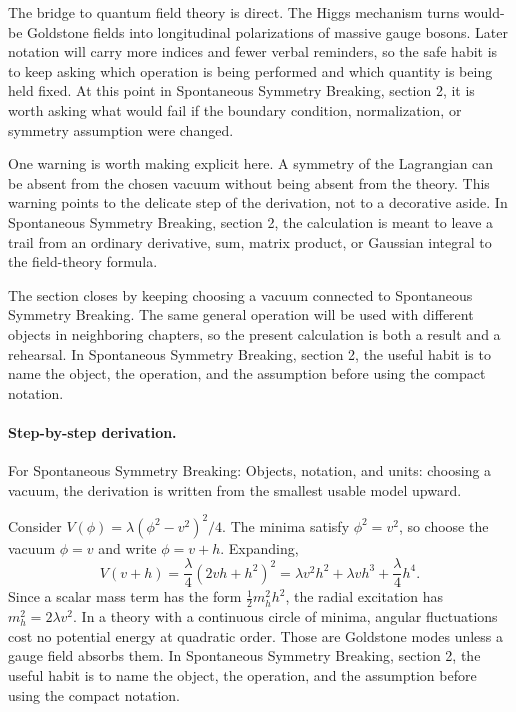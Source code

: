 The bridge to quantum field theory is direct.  The Higgs mechanism turns would-be Goldstone fields into longitudinal polarizations of massive gauge bosons.  Later notation will carry more indices and fewer verbal reminders, so the safe habit is to keep asking which operation is being performed and which quantity is being held fixed.  At this point in Spontaneous Symmetry Breaking, section 2, it is worth asking what would fail if the boundary condition, normalization, or symmetry assumption were changed.

One warning is worth making explicit here.  A symmetry of the Lagrangian can be absent from the chosen vacuum without being absent from the theory.  This warning points to the delicate step of the derivation, not to a decorative aside.  In Spontaneous Symmetry Breaking, section 2, the calculation is meant to leave a trail from an ordinary derivative, sum, matrix product, or Gaussian integral to the field-theory formula.

The section closes by keeping choosing a vacuum connected to Spontaneous Symmetry Breaking.  The same general operation will be used with different objects in neighboring chapters, so the present calculation is both a result and a rehearsal.  In Spontaneous Symmetry Breaking, section 2, the useful habit is to name the object, the operation, and the assumption before using the compact notation.



\paragraph{Step-by-step derivation.}

For Spontaneous Symmetry Breaking: Objects, notation, and units: choosing a vacuum, the derivation is written from the smallest usable model upward.

Consider \(V(\phi)=\lambda(\phi^2-v^2)^2/4\).  The minima satisfy \(\phi^2=v^2\), so choose the vacuum \(\phi=v\) and write \(\phi=v+h\).  Expanding,
\[
  V(v+h)=\frac{\lambda}{4}(2vh+h^2)^2
  =\lambda v^2h^2+\lambda vh^3+\frac{\lambda}{4}h^4.
\]
Since a scalar mass term has the form \(\frac12m_h^2h^2\), the radial excitation has \(m_h^2=2\lambda v^2\).  In a theory with a continuous circle of minima, angular fluctuations cost no potential energy at quadratic order.  Those are Goldstone modes unless a gauge field absorbs them.  In Spontaneous Symmetry Breaking, section 2, the useful habit is to name the object, the operation, and the assumption before using the compact notation.

